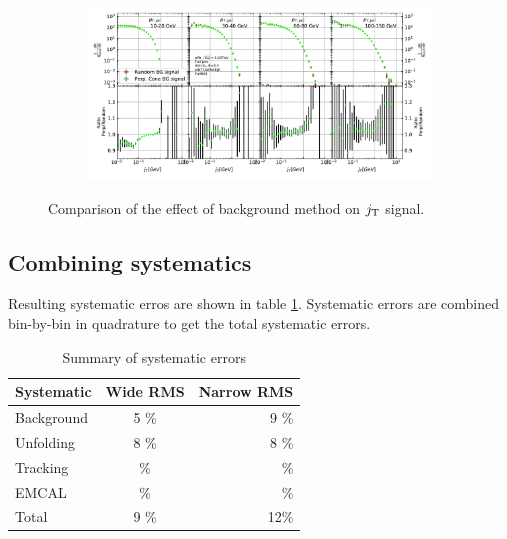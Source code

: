 \begin{figure}
\centering
\begin{subfigure}{0.95\textwidth}
\includegraphics[width=\textwidth]{results/MixedFullJetsR04SignalBackgroundComparison.pdf}
\end{subfigure}
\caption{Comparison of the effect of background method on $j_{\rm T}$ signal.}
\label{fig:signalbg}
\end{figure}



\subsection{Combining systematics}
Resulting systematic erros are shown in table \ref{tab:systematics}. Systematic errors are combined bin-by-bin in quadrature to get the total systematic errors.
\begin{table}[htb]
\centering
\caption{Summary of systematic errors}
\label{tab:systematics}
\begin{tabular}{ l | c | r }
  Systematic & Wide RMS & Narrow RMS \\
    \hline			
  Background & 5 \% & 9 \% \\
  Unfolding & 8 \% & 8 \% \\
  Tracking & \% & \% \\ 
  EMCAL & \% & \% \\
  Total & 9 \% & 12\% \\
  \hline
  \end{tabular}
  \end{table}